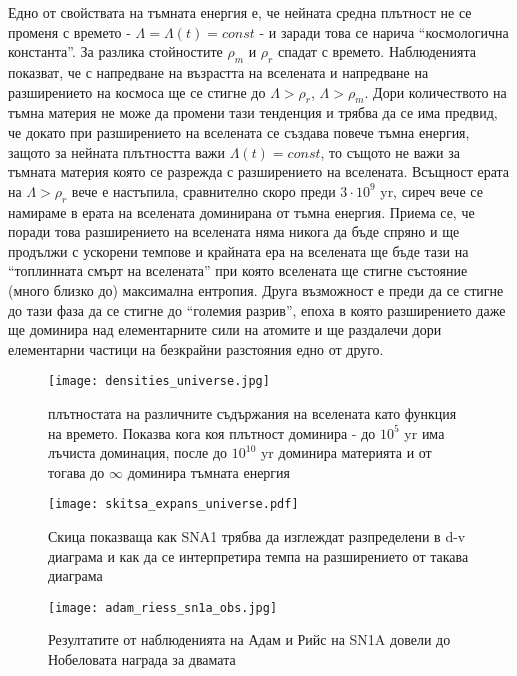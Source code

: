 \documentclass[a4paper,12pt]{article}
\begin{document}
Едно от свойствата на тъмната енергия е, че нейната средна плътност не се променя с времето - $\Lambda = \Lambda(t) = const$ - и заради това се нарича ``космологична константа''. За разлика стойностите $\rho_{m}$ и $\rho_{r}$ спадат с времето. Наблюденията показват, че с напредване на възрастта на вселената и напредване на разширението на космоса ще се стигне до $\Lambda > \rho_r$, $\Lambda > \rho_m$. Дори количеството на тъмна материя не може да промени тази тенденция и трябва да се има предвид, че докато при разширението на вселената се създава повече тъмна енергия, защото за нейната плътността важи $\Lambda(t)=const$, то същото не важи за тъмната материя която се разрежда с разширението на вселената. Всъщност ерата на $\Lambda > \rho_r$ вече е настъпила, сравнително скоро преди $3 \cdot 10^9$ yr, сиреч вече се намираме в ерата на вселената доминирана от тъмна енергия. Приема се, че поради това разширението на вселената няма никога да бъде спряно и ще продължи с ускорени темпове и крайната ера на вселената ще бъде тази на ``топлинната смърт на вселената'' при която вселената ще стигне състояние (много близко до) максимална ентропия. Друга възможност е преди да се стигне до тази фаза да се стигне до ``големия разрив'', епоха в която разширението даже ще доминира над елементарните сили на атомите и ще раздалечи дори елементарни частици на безкрайни разстояния едно от друго.


\begin{figure}[h!] %
\centering
\texttt{[image: densities\_universe.jpg]}
\caption{плътностата на различните съдържания на вселената като функция на времето. Показва кога коя плътност доминира - до $10^5$ yr има лъчиста доминация, после до $10^{10}$ yr доминира материята и от тогава до $\infty$ доминира тъмната енергия}
\label{fig:densities_universe}
\end{figure}


\begin{figure}[h!] %
\centering
\texttt{[image: skitsa\_expans\_universe.pdf]}
\caption{Скица показваща как SNA1 трябва да изглеждат разпределени в d-v диаграма и как да се интерпретира темпа на разширението от такава диаграма}
\label{fig:skitsa_expans_universe}
\end{figure}


\begin{figure}[h!] %
\centering
\texttt{[image: adam\_riess\_sn1a\_obs.jpg]}
\caption{Резултатите от наблюденията на Адам и Рийс на SN1A довели до Нобеловата награда за двамата}
\label{fig:adam_riess_sn1a_obs}
\end{figure}
\end{document}
